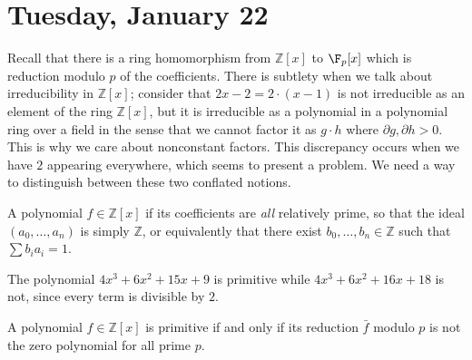 
\section{Tuesday, January 22}

Recall that there is a ring homomorphism from $\mathbb{Z}[x]$ to $\F_p[x]$ which is reduction modulo $p$ of the coefficients. There is subtlety when we talk about irreducibility in $\mathbb{Z}[x]$; consider that $2x-2 = 2 \cdot (x-1)$ is not irreducible as an element of the ring $\mathbb{Z}[x]$, but it is irreducible as a polynomial in a polynomial ring over a field in the sense that we cannot factor it as $g\cdot h$ where $\partial g, \partial h > 0$. This is why we care about nonconstant factors. This discrepancy occurs when we have $2$ appearing everywhere, which seems to present a problem. We need a way to distinguish between these two conflated notions.

\begin{definition}[Primitive]
A polynomial $f \in \mathbb{Z}[x]$ if its coefficients are \emph{all} relatively prime, so that the ideal $(a_0, \dotsc, a_n)$ is simply $\mathbb{Z}$, or equivalently that there exist $b_0,\dotsc,b_n \in \mathbb{Z}$ such that $\sum b_ia_i = 1$.
\end{definition}

\begin{example}
The polynomial $4x^3 + 6x^2 + 15x + 9$ is primitive while $4x^3 + 6x^2 + 16x + 18$ is not, since every term is divisible by $2$.
\end{example}

\begin{proposition}
A polynomial $f \in \mathbb{Z}[x]$ is primitive if and only if its reduction $\bar{f}$ modulo $p$ is not the zero polynomial for all prime $p$.
\end{proposition}

